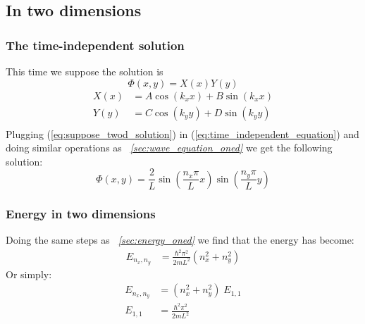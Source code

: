 \documentclass[a4paper, 10pt]{article}
\begin{document}
    \subsection{In two dimensions}
        \subsubsection{The time-independent solution}
        This time we suppose the solution is
        \begin{equation} \label{eq:suppose_twod_solution}
            \Phi(x, y) = X(x)Y(y)
        \end{equation}
        \begin{align*}
            X(x) &= A\cos(k_x x) + B \sin(k_x x) \\
            Y(y) &= C\cos(k_y y) + D \sin(k_y y) \\
        \end{align*}
        Plugging (\ref{eq:suppose_twod_solution}) in (\ref{eq:time_independent_equation})
        and doing similar operations as \emph{~\ref{sec:wave_equation_oned}} we get
        the following solution:
        \begin{equation} \label{eq:twod_solution}
            \Phi(x, y) = \frac{2}{L} \sin\left( \frac{n_x\pi}{L}x\right)
                         \sin\left( \frac{n_y\pi}{L} y\right)
        \end{equation}

        \subsubsection{Energy in two dimensions}
        Doing the same steps as \emph{~\ref{sec:energy_oned}} we find that the energy has
        become:
        \begin{align}
            E_{n_x, n_y} &= \frac{\hbar^2 \pi^2}{2mL^2} (n^2_x + n^2_y)
        \end{align}
        Or simply:
        \begin{align*}
        E_{n_x, n_y} &= (n^2_x + n^2_y) \; E_{1,1} \\
        E_{1,1} &= \frac{\hbar^2 \pi^2}{2mL^2} 
        \end{align*}
\end{document}
